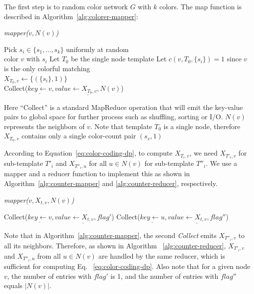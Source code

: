 The first step is to random color network $G$ with $k$ colors. The map function 
is described in Algorithm~\ref{alg:colorer-mapper}:

\begin{algorithm}[ht]
  \caption{\emph{mapper($v, N(v)$)}}
  \label{alg:colorer-mapper}
  \begin{algorithmic}[1]
    \STATE Pick $s_i \in \{s_1,\ldots,s_k\}$ uniformly at random\\
	\STATE color $v$ with $s_i$
	\STATE Let $T_0$ be the single node template
	\STATE Let $c(v, T_0, \{s_i\})=1$ since $v$ is the only colorful matching\\
    \STATE $X_{T_0, v} \leftarrow \{(\{s_i\}, 1)\}$ \\
    \STATE Collect($\underline{key \leftarrow v}, \underline{value \leftarrow X_{T_0, v}, N(v)}$)
  \end{algorithmic}
\end{algorithm}

Here ``Collect'' is a standard MapReduce operation that will emit the key-value
pairs to global space for further process such as shuffling, sorting or I/O.
$N(v)$ represents the neighbors of $v$. Note that template $T_0$ is a single
node, therefore $X_{T_0, v}$ contains only a single color-count pair $({s_v}, 1)$

According to Equation~\ref{eq:color-coding-dp}, to compute $X_{T_i, v}$, we need $X_{T'_i, v}$ for
sub-template $T'_i$ and $X_{T''_i, u}$ for all $u \in N(v)$ for sub-template
$T''_i$. We use a mapper and a reducer function to implement this as shown in
Algorithm~\ref{alg:counter-mapper} and \ref{alg:counter-reducer}, respectively.

\begin{algorithm}[ht]
  \caption{\emph{mapper($v, X_{t, v}, N(v)$)}}
  \label{alg:counter-mapper}
  \begin{algorithmic}[1]
      \STATE Collect($\underline{key \leftarrow v}, \underline{value \leftarrow X_{t, v}, flag'}$)
    \ELSE
        \STATE Collect($\underline{key \leftarrow u}, \underline{value \leftarrow X_{t, v}, flag''}$)
      \ENDFOR
    \ENDIF
  \end{algorithmic}
\end{algorithm}

Note that in Algorithm~\ref{alg:counter-mapper}, the second \textit{Collect} emits
$X_{T''_i, v}$ to all its neighbors. Therefore, as shown in Algorithm
~\ref{alg:counter-reducer}, $X_{T'_i, v}$ and $X_{T''_i, u}$ from all $u \in
N(v)$ are handled by the same reducer, which is sufficient for computing Eq.
~\ref{eq:color-coding-dp}. Also note that for a given node
$v$, the number of entries with $flag'$ is 1, and the number of entries with
$flag''$ equals $|N(v)|$.


